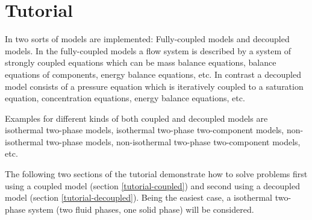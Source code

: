 \chapter[Tutorial]{Tutorial}\label{chp:tutorial}

In \Dumux two sorts of models are implemented: Fully-coupled models and decoupled models. In the fully-coupled models a flow system is described by a system of strongly coupled equations which can be mass balance equations, balance equations of components, energy balance equations, etc. In contrast a decoupled model consists of a pressure equation which is iteratively coupled to a saturation equation, concentration equations, energy balance equations, etc.

Examples for different kinds of both coupled and decoupled models are isothermal two-phase models, isothermal two-phase two-component models, non-isothermal two-phase models, non-isothermal two-phase two-component models, etc.

The following two sections of the tutorial demonstrate how to solve problems first using a coupled model (section \ref{tutorial-coupled}) and second using a decoupled model (section \ref{tutorial-decoupled}). Being the easiest case, a isothermal two-phase system (two fluid phases, one solid phase) will be considered.


%